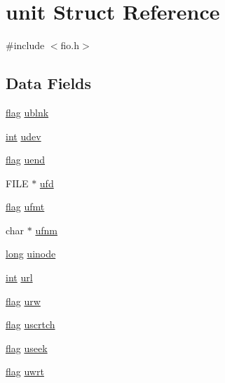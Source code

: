 \hypertarget{structunit}{}\section{unit Struct Reference}
\label{structunit}


{\ttfamily \#include $<$fio.\+h$>$}

\subsection*{Data Fields}
\begin{DoxyCompactItemize}
\item 
\hyperlink{dependencies_2third-party_2clapack_23_82_81_2_f2_c_l_i_b_s_2libf2c_2f2c_8h_abf5d144da384425ae6cb542ce6eec8d3}{flag} \hyperlink{structunit_ab16de04289da2318bcc3fdf269914765}{ublnk}
\item 
\hyperlink{lp__lib_8h_adeb9ec6400320e4923ac9d836d509ddb}{int} \hyperlink{structunit_a8c7e97b7621cbeaaf9736ec2f89f79c0}{udev}
\item 
\hyperlink{dependencies_2third-party_2clapack_23_82_81_2_f2_c_l_i_b_s_2libf2c_2f2c_8h_abf5d144da384425ae6cb542ce6eec8d3}{flag} \hyperlink{structunit_a49bb8731183f9787d130b6eb319d9503}{uend}
\item 
F\+I\+LE $\ast$ \hyperlink{structunit_acf3c844baecd12fa90768de0fa495913}{ufd}
\item 
\hyperlink{dependencies_2third-party_2clapack_23_82_81_2_f2_c_l_i_b_s_2libf2c_2f2c_8h_abf5d144da384425ae6cb542ce6eec8d3}{flag} \hyperlink{structunit_a4f5378dc3f43a2b8dcaab697fdf5cfae}{ufmt}
\item 
char $\ast$ \hyperlink{structunit_a96ba06cabbd37fa00700f92409349340}{ufnm}
\item 
\hyperlink{lp__lib_8h_ad3500e0f98a49bb08992451a297ce6a6}{long} \hyperlink{structunit_a23555dc07df6eec9b95a1479f55fe968}{uinode}
\item 
\hyperlink{lp__lib_8h_adeb9ec6400320e4923ac9d836d509ddb}{int} \hyperlink{structunit_a3ece021e3f66a7ea800217ee1d43cdf8}{url}
\item 
\hyperlink{dependencies_2third-party_2clapack_23_82_81_2_f2_c_l_i_b_s_2libf2c_2f2c_8h_abf5d144da384425ae6cb542ce6eec8d3}{flag} \hyperlink{structunit_a9ac30bf06d498b7c467e58f759f5015b}{urw}
\item 
\hyperlink{dependencies_2third-party_2clapack_23_82_81_2_f2_c_l_i_b_s_2libf2c_2f2c_8h_abf5d144da384425ae6cb542ce6eec8d3}{flag} \hyperlink{structunit_a7539bbc90dbc0c92fc7c1787b0a02c74}{uscrtch}
\item 
\hyperlink{dependencies_2third-party_2clapack_23_82_81_2_f2_c_l_i_b_s_2libf2c_2f2c_8h_abf5d144da384425ae6cb542ce6eec8d3}{flag} \hyperlink{structunit_a1dbff897975aa81144952d8415f2c872}{useek}
\item 
\hyperlink{dependencies_2third-party_2clapack_23_82_81_2_f2_c_l_i_b_s_2libf2c_2f2c_8h_abf5d144da384425ae6cb542ce6eec8d3}{flag} \hyperlink{structunit_a42e3a5611817ba6da3a2255c338bc97c}{uwrt}
\end{DoxyCompactItemize}


